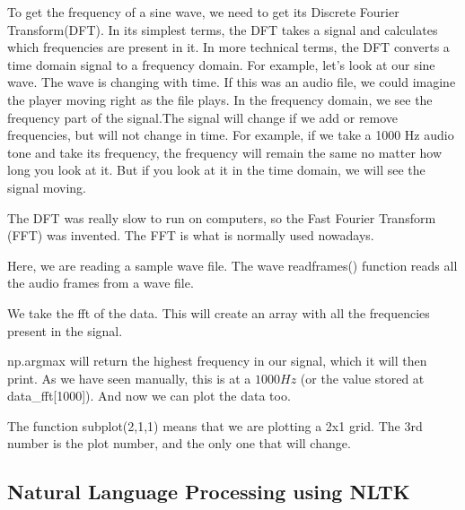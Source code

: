 \documentclass[14pt,a4paper]{article}
\begin{document}
\par To get the frequency of a sine wave, we need to get its Discrete Fourier Transform(DFT).
In its simplest terms, the DFT takes a signal and calculates which frequencies are present in it. In more technical terms, the DFT converts a time domain signal to a frequency domain. For example, let’s look at our sine wave.
The wave is changing with time. If this was an audio file, we could imagine the player moving right as the file plays.
In the frequency domain, we see the frequency part of the signal.The signal will change if we add or remove frequencies, but will not change in time. For example, if we take a 1000 Hz audio tone and take its frequency, the frequency will remain the same no matter how long you look at it. But if you look at it in the time domain, we will see the signal moving.
\par The DFT was really slow to run on computers, so the Fast Fourier Transform (FFT) was invented. The FFT is what is normally used nowadays.
\par Here, we are reading a sample wave file. The wave readframes() function reads all the audio frames from a wave file.
\par We take the fft of the data. This will create an array with all the frequencies present in the signal.
\par np.argmax will return the highest frequency in our signal, which it will then print. As we have seen manually, this is at a $1000Hz$ (or the value stored at data\_fft[1000]). And now we can plot the data too.
\par The function subplot(2,1,1) means that we are plotting a 2x1 grid. The 3rd number is the plot number, and the only one that will change.

\subsection{Natural Language Processing using NLTK}
\end{document}
